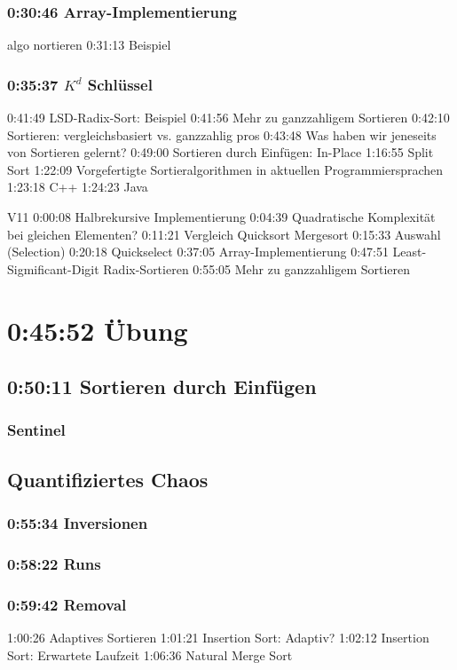 \documentclass[a4paper]{scrartcl}
\begin{document}
			\subsubsection{0:30:46 Array-Implementierung}
			algo nortieren
			0:31:13 Beispiel
			
			\subsubsection{0:35:37 \(K^d\) Schlüssel}
			0:41:49 LSD-Radix-Sort: Beispiel 
			0:41:56 Mehr zu ganzzahligem Sortieren 
			0:42:10 Sortieren: vergleichsbasiert vs. ganzzahlig 
			pros
			0:43:48 Was haben wir jeneseits von Sortieren gelernt? 
			0:49:00 Sortieren durch Einfügen: In-Place 
			1:16:55 Split Sort 
			1:22:09 Vorgefertigte Sortieralgorithmen in aktuellen Programmiersprachen 
			1:23:18 C++ 
			1:24:23 Java 
			
			V11	
			0:00:08 Halbrekursive Implementierung 
			0:04:39 Quadratische Komplexität bei gleichen Elementen? 
			0:11:21 Vergleich Quicksort Mergesort 
			0:15:33 Auswahl (Selection) 
			0:20:18 Quickselect 
			0:37:05 Array-Implementierung 
			0:47:51 Least-Sigmificant-Digit Radix-Sortieren 
			0:55:05 Mehr zu ganzzahligem Sortieren 
			
	\section{0:45:52 Übung} 
		\subsection{0:50:11 Sortieren durch Einfügen}
			\subsubsection{Sentinel}
			
		\subsection{Quantifiziertes Chaos}
			\subsubsection{0:55:34 Inversionen} 
			\subsubsection{0:58:22 Runs }
			\subsubsection{0:59:42 Removal} 
			1:00:26 Adaptives Sortieren 
			1:01:21 Insertion Sort: Adaptiv? 
			1:02:12 Insertion Sort: Erwartete Laufzeit 
			1:06:36 Natural Merge Sort 
\end{document}
